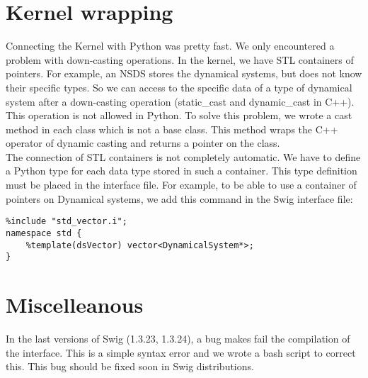 \section{Kernel wrapping}

Connecting the Kernel with Python was pretty fast. We only encountered a problem with down-casting operations. In the kernel, we have STL containers of pointers. For example, an NSDS stores the dynamical systems, but does not know their specific types. So we can access to the specific data of a type of dynamical system after a down-casting operation (static\_cast and dynamic\_cast in C++). This operation is not allowed in Python. To solve this problem, we wrote a cast method in each class which is not a base class. This method wraps the C++ operator of dynamic casting and returns a pointer on the class.\\

The connection of STL containers is not completely automatic. We have to define a Python type for each data type stored in such a container. This type definition must be placed in the interface file. For example, to be able to use a container of pointers on Dynamical systems, we add this command in the Swig interface file: 
\begin{verbatim}
%include "std_vector.i";
namespace std {
    %template(dsVector) vector<DynamicalSystem*>;
}
\end{verbatim}



\section{Miscelleanous}

In the last versions of Swig (1.3.23, 1.3.24), a bug makes fail the compilation of the interface. This is a simple syntax error and we wrote a bash script to correct this. This bug should be fixed soon in Swig distributions.
